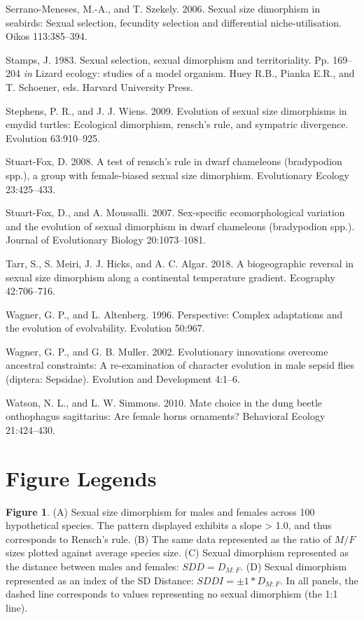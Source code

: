 \documentclass[]{article}
\begin{document}
\hypertarget{ref-Serrano-Meneses2006}{}
Serrano-Meneses, M.-A., and T. Szekely. 2006. Sexual size dimorphism in
seabirds: Sexual selection, fecundity selection and differential
niche-utilisation. Oikos 113:385--394.

\hypertarget{ref-Stamps1983}{}
Stamps, J. 1983. Sexual selection, sexual dimorphism and territoriality.
Pp. 169--204 \emph{in} Lizard ecology: studies of a model organism. Huey
R.B., Pianka E.R., and T. Schoener, eds. Harvard University Press.

\hypertarget{ref-Stephens2009}{}
Stephens, P. R., and J. J. Wiens. 2009. Evolution of sexual size
dimorphisms in emydid turtles: Ecological dimorphism, rensch's rule, and
sympatric divergence. Evolution 63:910--925.

\hypertarget{ref-Stuart-Fox2008}{}
Stuart-Fox, D. 2008. A test of rensch's rule in dwarf chameleons
(bradypodion spp.), a group with female-biased sexual size dimorphism.
Evolutionary Ecology 23:425--433.

\hypertarget{ref-Stuart-Fox2007}{}
Stuart-Fox, D., and A. Moussalli. 2007. Sex-specific ecomorphological
variation and the evolution of sexual dimorphism in dwarf chameleons
(bradypodion spp.). Journal of Evolutionary Biology 20:1073--1081.

\hypertarget{ref-Tarr2018}{}
Tarr, S., S. Meiri, J. J. Hicks, and A. C. Algar. 2018. A biogeographic
reversal in sexual size dimorphism along a continental temperature
gradient. Ecography 42:706--716.

\hypertarget{ref-Wagner1996a}{}
Wagner, G. P., and L. Altenberg. 1996. Perspective: Complex adaptations
and the evolution of evolvability. Evolution 50:967.

\hypertarget{ref-Wagner2002}{}
Wagner, G. P., and G. B. Muller. 2002. Evolutionary innovations overcome
ancestral constraints: A re-examination of character evolution in male
sepsid flies (diptera: Sepsidae). Evolution and Development 4:1--6.

\hypertarget{ref-Watson2010}{}
Watson, N. L., and L. W. Simmons. 2010. Mate choice in the dung beetle
onthophagus sagittarius: Are female horns ornaments? Behavioral Ecology
21:424--430.

\newpage

\section{Figure Legends}\label{figure-legends}

\textbf{Figure 1}. (A) Sexual size dimorphism for males and females
across 100 hypothetical species. The pattern displayed exhibits a slope
\textgreater{} 1.0, and thus corresponds to Rensch's rule. (B) The same
data represented as the ratio of \(M/F\) sizes plotted against average
species size. (C) Sexual dimorphism represented as the distance between
males and females: \(SDD = D_{M:F}\). (D) Sexual dimorphism represented
as an index of the SD Distance: \(SDDI = \pm1*D_{M:F}\). In all panels,
the dashed line corresponds to values representing no sexual dimorphism
(the 1:1 line). \hfill\break
\end{document}
